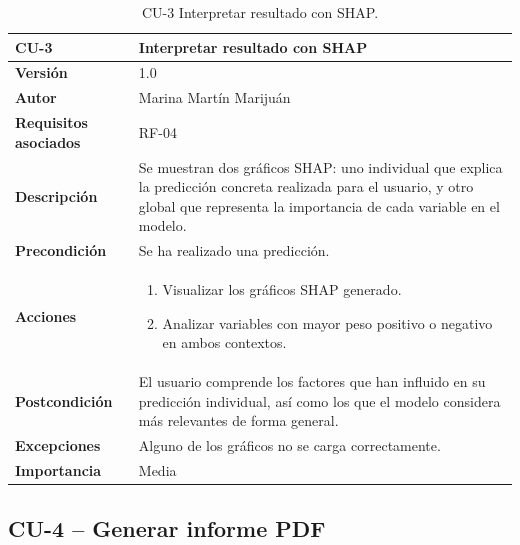 \begin{table}[!htbp]
	\centering
	\begin{tabularx}{\linewidth}{ p{} p{} }
		\toprule
		\textbf{CU-3}    & Interpretar resultado con SHAP \\
		\toprule
		\textbf{Versión}              & 1.0    \\
		\textbf{Autor}                & Marina Martín Marijuán \\
		\textbf{Requisitos asociados} & RF-04 \\
		\textbf{Descripción}          & Se muestran dos gráficos SHAP: uno individual que explica la predicción concreta realizada para el usuario, y otro global que representa la importancia de cada variable en el modelo. \\
		\textbf{Precondición}         & Se ha realizado una predicción. \\
		\textbf{Acciones}             &
		\begin{enumerate}
			\item Visualizar los gráficos SHAP generado.
			\item Analizar variables con mayor peso positivo o negativo en ambos contextos.
		\end{enumerate}\\
		\textbf{Postcondición}        & El usuario comprende los factores que han influido en su predicción individual, así como los que el modelo considera más relevantes de forma general. \\
		\textbf{Excepciones}          & Alguno de los gráficos no se carga correctamente. \\
		\textbf{Importancia}          & Media \\
		\bottomrule
	\end{tabularx}
	\caption{CU-3 Interpretar resultado con SHAP.}
\end{table}


\subsection{CU-4 – Generar informe PDF}

